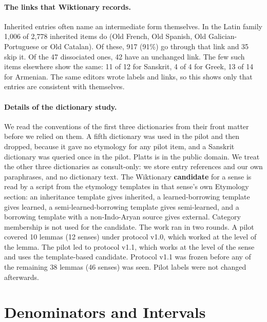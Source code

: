 \documentclass[11pt]{article}
\begin{document}
\paragraph{The links that Wiktionary records.} Inherited entries often name an intermediate form themselves. In the Latin family 1,006 of 2,778 inherited items do (Old French, Old Spanish, Old Galician-Portuguese or Old Catalan). Of these, 917 (91\%) go through that link and 35 skip it. Of the 47 dissociated ones, 42 have an unchanged link. The few such items elsewhere show the same: 11 of 12 for Sanskrit, 4 of 4 for Greek, 13 of 14 for Armenian. The same editors wrote labels and links, so this shows only that entries are consistent with themselves.

\paragraph{Details of the dictionary study.} We read the conventions of the first three dictionaries from their front matter before we relied on them. A fifth dictionary was used in the pilot and then dropped, because it gave no etymology for any pilot item, and a Sanskrit dictionary was queried once in the pilot. Platts is in the public domain. We treat the other three dictionaries as consult-only: we store entry references and our own paraphrases, and no dictionary text. The Wiktionary \textbf{candidate} for a sense is read by a script from the etymology templates in that sense's own Etymology section: an inheritance template gives inherited, a learned-borrowing template gives learned, a semi-learned-borrowing template gives semi-learned, and a borrowing template with a non-Indo-Aryan source gives external. Category membership is not used for the candidate. The work ran in two rounds. A pilot covered 10 lemmas (12 senses) under protocol v1.0, which worked at the level of the lemma. The pilot led to protocol v1.1, which works at the level of the sense and uses the template-based candidate. Protocol v1.1 was frozen before any of the remaining 38 lemmas (46 senses) was seen. Pilot labels were not changed afterwards.

\section{Denominators and Intervals}
\label{app:denominators}
\end{document}
